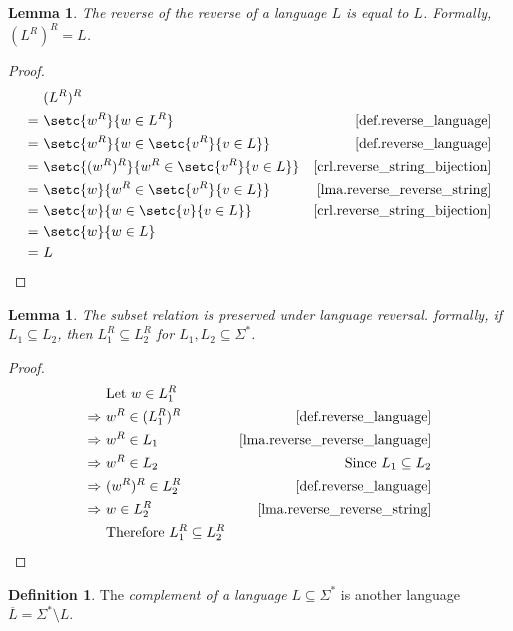 \documentclass{report}
\newtheorem{lemma}[theorem]{Lemma}
\theoremstyle{definition}
\newtheorem{definition}[theorem]{Definition}
\begin{document}
\begin{appendices}
\begin{lemma} \label{lma.reverse_reverse_language}
The reverse of the reverse of a language $L$ is equal to
$L$. Formally, $(L^R)^R = L$.
\end{lemma}

\begin{proof}
\begin{align*}
& (L^R)^R \\
= \ & \setc{w^R}{w \in L^R}
& \text{\cref{def.reverse_language}} \\
= \ & \setc{w^R}{w \in \setc{v^R}{v \in L}} &
\text{\cref{def.reverse_language}} \\
= \ & \setc{(w^R)^R}{w^R \in \setc{v^R}{v \in L}} &
\text{\cref{crl.reverse_string_bijection}} \\
= \ & \setc{w}{w^R \in \setc{v^R}{v \in L}} &
\text{\cref{lma.reverse_reverse_string}} \\
= \ & \setc{w}{w \in \setc{v}{v \in L}} &
\text{\cref{crl.reverse_string_bijection}} \\
= \ & \setc{w}{w \in L} \\
= \ & L
\end{align*}
\end{proof}

\begin{lemma} \label{lma.reverse_language_subset}
The subset relation is preserved under language reversal. formally,
if $L_1 \subseteq L_2$, then $L_1^R \subseteq L_2^R$ for
$L_1, L_2 \subseteq \Sigma^{\ast}$.
\end{lemma}

\begin{proof}
\begin{align*}
& \text{Let } w \in L_1^R \\
\Rightarrow \ & w^R \in (L_1^R)^R
& \text{\cref{def.reverse_language}} \\
\Rightarrow \ & w^R \in L_1
& \text{\cref{lma.reverse_reverse_language}} \\
\Rightarrow \ & w^R \in L_2
& \text{Since } L_1 \subseteq L_2 \\
\Rightarrow \ & (w^R)^R \in L_2^R
& \text{\cref{def.reverse_language}} \\
\Rightarrow \ & w \in L_2^R
& \text{\cref{lma.reverse_reverse_string}} \\
& \text{Therefore } L_1^R \subseteq L_2^R
\end{align*}
\end{proof}

\begin{definition} \label{def.complement_language}
The \emph{complement of a language} $L \subseteq \Sigma^{\ast}$ is another language
$\overline{L} = \Sigma^{\ast} \setminus L$.
\end{definition}


\end{appendices}
\end{document}
